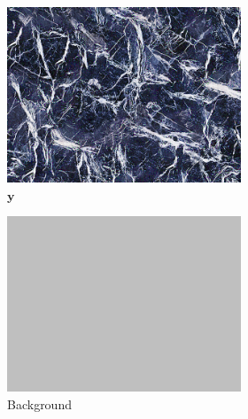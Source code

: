 \begin{figure}[]
\begin{subfigure}{\textwidth}
        \begin{subfigure}{0.19\textwidth}
            \centering
            \includegraphics[width=\textwidth]{images/04-experiment02/isolating_issues/target.jpg}
            \caption*{\(\bm{y}\)}
        \end{subfigure}
        \hfill
        \begin{subfigure}{0.19\textwidth}
            \centering
            \includegraphics[width=\textwidth]{images/04-experiment02/isolating_issues/190_bg.jpg}
            \caption*{Background}
        \end{subfigure}
        \hfill
        \begin{subfigure}{0.19\textwidth}

\end{subfigure}
\end{subfigure}
\end{figure}
